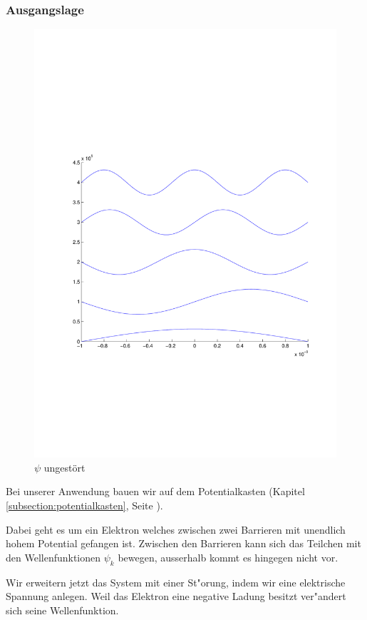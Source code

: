 \begin{refsection}
\subsubsection{Ausgangslage}

\begin{figure}
 \centering
 \includegraphics[width=12cm,clip=true,trim=2cm 7cm 1cm 8cm]{efeld/Psi_ungestoert.pdf}
 \caption{$\psi$ ungest\"ort}
 \label{abb:efeld_psi_ungestoert}
\end{figure}

Bei unserer Anwendung bauen wir auf dem Potentialkasten (Kapitel \ref{subsection:potentialkasten}, Seite \pageref{subsection:potentialkasten}).

Dabei geht es um ein Elektron welches zwischen zwei Barrieren mit unendlich hohem Potential gefangen ist.
Zwischen den Barrieren kann sich das Teilchen mit den Wellenfunktionen $\psi_k$ bewegen,
ausserhalb kommt es hingegen nicht vor.

Wir erweitern jetzt das System mit einer St"orung, indem wir eine elektrische Spannung anlegen.
Weil das Elektron eine negative Ladung besitzt ver"andert sich seine Wellenfunktion.


\end{refsection}

